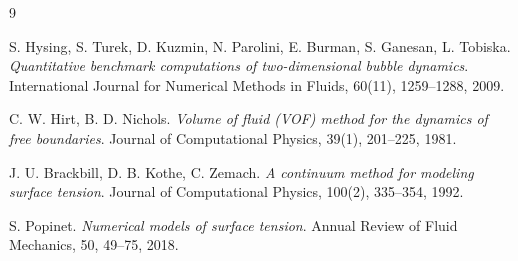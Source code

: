 \documentclass[12pt,a4paper]{article}
\begin{document}
\begin{thebibliography}{9}

S. Hysing, S. Turek, D. Kuzmin, N. Parolini, E. Burman, S. Ganesan, L. Tobiska.
\textit{Quantitative benchmark computations of two-dimensional bubble dynamics}.
International Journal for Numerical Methods in Fluids, 60(11), 1259--1288, 2009.

C. W. Hirt, B. D. Nichols.
\textit{Volume of fluid (VOF) method for the dynamics of free boundaries}.
Journal of Computational Physics, 39(1), 201--225, 1981.

J. U. Brackbill, D. B. Kothe, C. Zemach.
\textit{A continuum method for modeling surface tension}.
Journal of Computational Physics, 100(2), 335--354, 1992.

S. Popinet.
\textit{Numerical models of surface tension}.
Annual Review of Fluid Mechanics, 50, 49--75, 2018.

\end{thebibliography}
\end{document}
